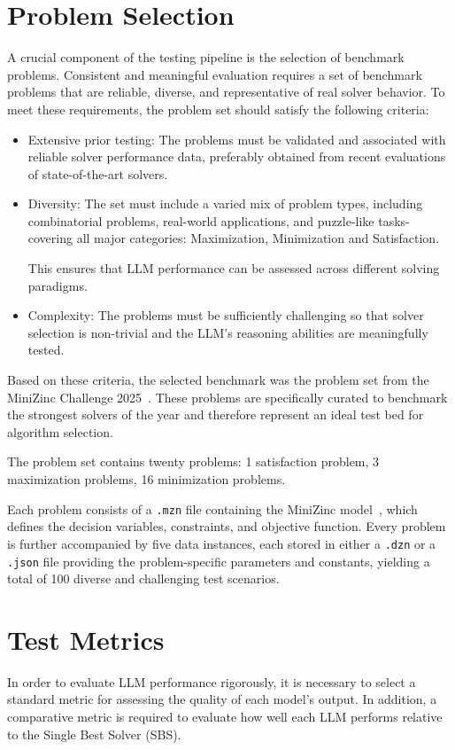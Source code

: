 \documentclass[../../main]{subfiles}
\begin{document}
\section{Problem Selection}
\label{sec:probSelection}
A crucial component of the testing pipeline is the selection of benchmark problems. Consistent and meaningful evaluation requires a set of benchmark problems that are reliable, diverse, and representative of real solver behavior. To meet these requirements, the problem set should satisfy the following criteria:
\begin{itemize}
    \item Extensive prior testing: The problems must be validated and
    associated with reliable solver performance data, preferably obtained from
    recent evaluations of state-of-the-art solvers.
    \item Diversity: The set must include a varied mix of
    problem types, including combinatorial problems, real-world applications,
    and puzzle-like tasks-covering all major categories: Maximization, Minimization and Satisfaction.

    This ensures that LLM performance can be assessed across different solving
    paradigms.
    \item Complexity: The problems must be sufficiently challenging so
    that solver selection is non-trivial and the LLM's reasoning abilities are
    meaningfully tested.
\end{itemize}
Based on these criteria, the selected benchmark was the problem set from the MiniZinc Challenge 2025~\cite{PhilMznChallenge, MznProblems, MznResults25}. These problems are specifically curated to benchmark the strongest solvers of the year and therefore represent an ideal test bed for algorithm selection.

The problem set contains twenty problems: 1 satisfaction problem, 3 maximization problems, 16 minimization problems.

Each problem consists of a \texttt{.mzn} file containing the MiniZinc model~\cite{MiniZinc}, which defines the decision variables, constraints, and objective function. Every problem is further accompanied by five data instances, each stored in either a \texttt{.dzn} or a \texttt{.json} file providing the problem-specific parameters and constants, yielding a total of 100 diverse and challenging test scenarios.

\section{Test Metrics}
\label{sec:metrics}
In order to evaluate LLM performance rigorously, it is necessary to select a standard metric for assessing the quality of each model's output. In addition, a comparative metric is required to evaluate how well each LLM performs relative to the Single Best Solver (SBS).
\end{document}
